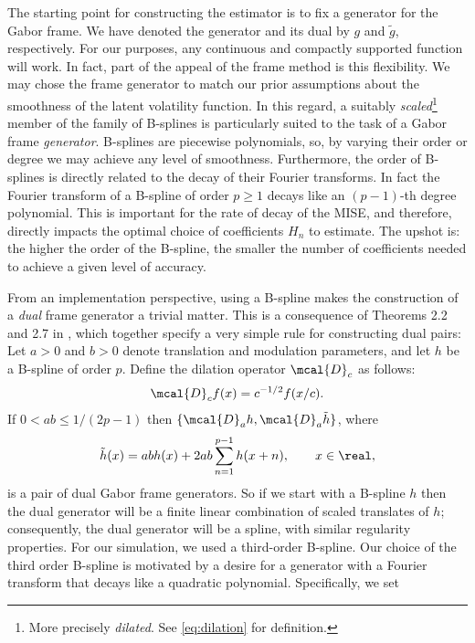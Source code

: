 The starting point for constructing the estimator is to fix a generator for the Gabor frame. We have denoted the generator and its dual by $g$ and $\tilde{g}$, respectively. For our purposes, any continuous and compactly supported function will work. In fact, part of the appeal of the frame method is this flexibility. We may chose the frame generator to match our prior assumptions about the smoothness of the latent volatility function. In this regard, a suitably \emph{scaled}\footnote{More precisely \emph{dilated}. See \eqref{eq:dilation} for definition.} member of the family of B-splines is particularly suited to the task of a Gabor frame \emph{generator}. B-splines are  piecewise polynomials, so,  by varying their order or degree we may achieve any level of smoothness. Furthermore, the order of B-splines is directly related to the decay of their Fourier transforms. In fact the Fourier transform of a B-spline of order $p \ge 1$ decays like an $(p-1)$-th degree polynomial. This is important for the rate of decay of the MISE, and therefore, directly impacts the optimal choice of coefficients $H_n$ to estimate. The upshot is:  the higher the order of the B-spline, the smaller the number of  coefficients needed to achieve a given level of accuracy.       


From an implementation perspective, using a  B-spline  makes the construction of a \emph{dual}  frame generator a trivial matter. This is a consequence of Theorems 2.2 and 2.7 in \cite{Christensen2006}, which together specify a very simple rule for constructing  dual pairs: Let $a>0$ and $b>0$ denote  translation and modulation parameters, and let   $h$ be a B-spline of order $p$. Define the dilation operator  $\mcal{D}_c$ as follows:
\begin{align}
  \mcal{D}_c f(x) = c^{-1/2}f(x/c).  \label{eq:dilation}
\end{align}
If $0 < ab \le 1/(2 p -1)$ then  $\{\mcal{D}_a h, \mcal{D}_a\tilde{h}\}$, where 
\begin{align}
  \tilde{h}(x) = ab h(x) + 2 a b \sum^{p-1}_{n=1} h(x+n), \qquad  x \in \real, 
  \label{eq:gt}
\end{align}
is a pair of  dual Gabor  frame generators. So if we start with a B-spline $h$ then the dual generator will be a finite linear combination of scaled translates of $h$; consequently, the  dual generator will be a spline, with similar regularity properties.  For our simulation, we used a third-order B-spline. Our choice of the third order B-spline is motivated by a desire for a generator with a  Fourier transform that decays like a quadratic polynomial.   Specifically, we set
